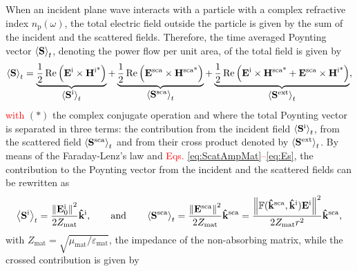 When an incident plane wave interacts with a particle with a complex refractive index $n_\text{p}(\omega)$, the total electric field outside the particle is given by the sum of the incident and the scattered fields. Therefore, the time averaged Poynting vector $\ev{\vb{S}}_t$, denoting the power flow per unit area, of the total field is given by
%
\begin{align}
	\ev{\vb{S}}_t
		= \underbrace{\frac12 \Re \qty(\vb{E}^\text{i}\times\vb{H}^\text{i*})}_{\text{\normalsize $\ev{\vb{S}^\text{i}}_t $}} +
		  \underbrace{\frac12 \Re \qty(\vb{E}^\text{sca}\times\vb{H}^\text{sca*})}_{\text{\normalsize $\ev{\vb{S}^\text{sca}}_t $}}+
		   \underbrace{	\frac12 \Re\qty(\vb{E}^\text{i}\times\vb{H}^\text{sca*} + \vb{E}^\text{sca}\times\vb{H}^\text{i*})}_{\text{\normalsize$\ev{\vb{S}^\text{ext}}_t$}},
 \label{eq:Stot}
\end{align}
%
\textcolor{red}{with} $(*)$  the complex conjugate operation and where the total Poynting vector is separated in three terms: the contribution from the incident field $\ev{\vb{S}^\text{i}}_t$, from the scattered field $\ev{\vb{S}^\text{sca}}_t$ and from their cross product denoted by $\ev{\vb{S}^\text{ext}}_t$. By means of the Faraday-Lenz's law and \textcolor{red}{Eqs. \eqref{eq:ScatAmpMat}--\eqref{eq:Es}}, the  contribution to the Poynting vector from the incident and the scattered fields can be rewritten as
%
%
\begin{equation}
	\ev{\vb{S}^\text{i}}_t = \frac{\norm{\vb{E}_0^\text{i}}^2}{2 Z_\text{mat}}\vu{k}^\text{i},
		\qquad\text{and}\qquad
	\ev{\vb{S}^\text{sca}}_t = \frac{\norm{\vb{E}^\text{sca}}^2}{2 Z_\text{mat}}\vu{k}^\text{sca}
						=  \frac{\norm{\mathbb{F}(\vu{k}^\text{sca},\vu{k}^\text{i})\vb{E}^\text{i}}^2}{2 Z_\text{mat}r^2}\vu{k}^\text{sca},
 \label{eq:AvePoyntingISca}
\end{equation}
%
with $Z_\text{mat} = \sqrt{\mu_\text{mat}/\varepsilon_\text{mat}}$, the impedance of the non-absorbing matrix, while the crossed contribution is given by
